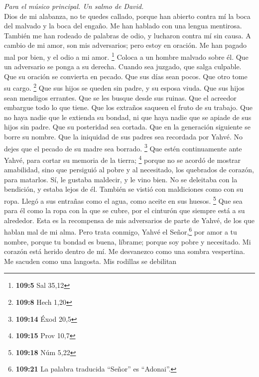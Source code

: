 \begin{paracol}{2}
\emph{Para el músico principal. Un salmo de David.}\\
 Dios de mi alabanza, no te quedes callado, 
porque han abierto contra mí la boca del malvado y la boca del engaño.
Me han hablado con una lengua mentirosa.  También me han
rodeado de palabras de odio, y lucharon contra mí sin causa.
 A cambio de mi amor, son mis adversarios; pero estoy en
oración.  Me han pagado mal por bien, y el odio a mi amor.
\footnote{\textbf{109:5} Sal 35,12}  Coloca a un hombre
malvado sobre él. Que un adversario se ponga a su derecha.
 Cuando sea juzgado, que salga culpable. Que su oración se
convierta en pecado.  Que sus días sean pocos. Que otro
tome su cargo. \footnote{\textbf{109:8} Hech 1,20}  Que
sus hijos se queden sin padre, y su esposa viuda.  Que
sus hijos sean mendigos errantes. Que se les busque desde sus ruinas.
 Que el acreedor embargue todo lo que tiene. Que los
extraños saqueen el fruto de su trabajo.  Que no haya
nadie que le extienda su bondad, ni que haya nadie que se apiade de sus
hijos sin padre.  Que su posteridad sea cortada. Que en
la generación siguiente se borre su nombre.  Que la
iniquidad de sus padres sea recordada por Yahvé. No dejes que el pecado
de su madre sea borrado. \footnote{\textbf{109:14} Éxod 20,5}
 Que estén continuamente ante Yahvé, para cortar su
memoria de la tierra; \footnote{\textbf{109:15} Prov 10,7}
 porque no se acordó de mostrar amabilidad, sino que
persiguió al pobre y al necesitado, los quebrados de corazón, para
matarlos.  Sí, le gustaba maldecir, y le vino bien. No se
deleitaba con la bendición, y estaba lejos de él. 
También se vistió con maldiciones como con su ropa. Llegó a sus entrañas
como el agua, como aceite en sus huesos. \footnote{\textbf{109:18} Núm
  5,22}  Que sea para él como la ropa con la que se
cubre, por el cinturón que siempre está a su alrededor. 
Esta es la recompensa de mis adversarios de parte de Yahvé, de los que
hablan mal de mi alma.  Pero trata conmigo, Yahvé el
Señor,\footnote{\textbf{109:21} La palabra traducida ``Señor'' es
  ``Adonai''.} por amor a tu nombre, porque tu bondad es buena, líbrame;
 porque soy pobre y necesitado. Mi corazón está herido
dentro de mí.  Me desvanezco como una sombra vespertina.
Me sacuden como una langosta.  Mis rodillas se debilitan

\end{paracol}
